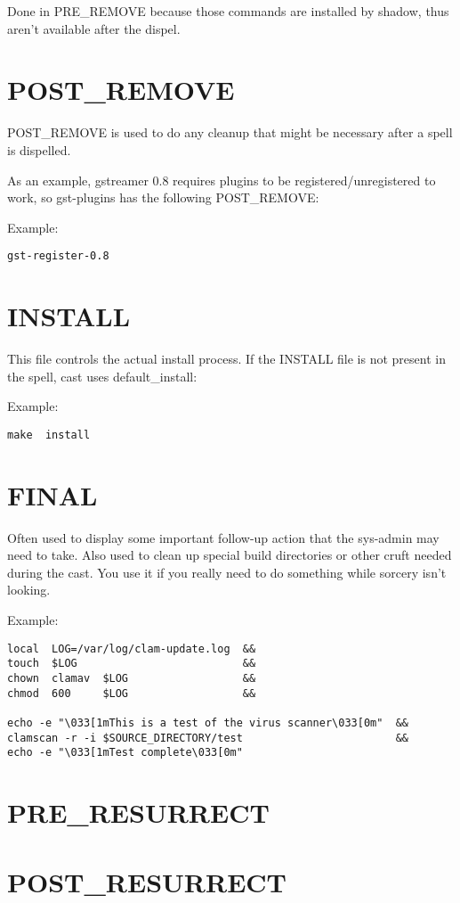 \documentclass[a4paper,10pt]{book}
\begin{document}
Done in PRE\_REMOVE because those commands are installed by shadow, thus aren't
available after the dispel.

\section{POST\_REMOVE}
POST\_REMOVE is used to do any cleanup that might be necessary after a spell is
dispelled.

As an example, gstreamer 0.8 requires plugins to be registered/unregistered to
work, so gst-plugins has the following POST\_REMOVE:

Example:
\begin{verbatim}
gst-register-0.8
\end{verbatim}

\section{INSTALL}
This file controls the actual install process.  If the INSTALL file is not
present in the spell, cast uses default\_install:

Example:
\begin{verbatim}
make  install
\end{verbatim}


\section{FINAL}
Often used to display some important follow-up action that the sys-admin may
need to take. Also used to clean up special build directories or other cruft
needed during the cast. You use it if you really need to do something while
sorcery isn't looking.

Example:
\begin{verbatim}
local  LOG=/var/log/clam-update.log  &&
touch  $LOG                          &&
chown  clamav  $LOG                  &&
chmod  600     $LOG                  &&

echo -e "\033[1mThis is a test of the virus scanner\033[0m"  &&
clamscan -r -i $SOURCE_DIRECTORY/test                        &&
echo -e "\033[1mTest complete\033[0m"
\end{verbatim}

\section{PRE\_RESURRECT}
\section{POST\_RESURRECT}
\end{document}
